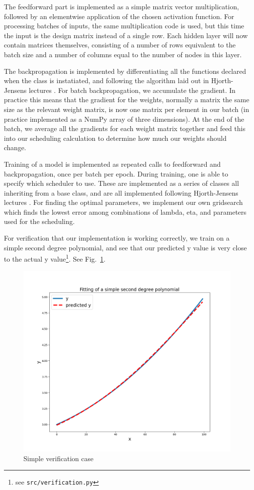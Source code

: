 \documentclass[onecolumn,10pt,cleanfoot]{asme2ej}
\begin{document}
The feedforward part is implemented as a simple matrix vector multiplication, followed by an elementwise application of the chosen activation function. For processing batches of inputs, the same multiplication code is used, but this time the input is the design matrix instead of a single row. Each hidden layer will now contain matrices themselves, consisting of a number of rows equivalent to the batch size and a number of columns equal to the number of nodes in this layer.

The backpropagation is implemented by differentiating all the functions declared when the class is instatiated, and following the algorithm laid out in Hjorth-Jensens lectures \cite{morten}. For batch backpropagation, we accumulate the gradient. In practice this means that the gradient for the weights, normally a matrix the same size as the relevant weight matrix, is now one matrix per element in our batch (in practice implemented as a NumPy array of three dimensions). At the end of the batch, we average all the gradients for each weight matrix together and feed this into our scheduling calculation to determine how much our weights should change.

Training of a model is implemented as repeated calls to feedforward and backpropagation, once per batch per epoch. During training, one is able to specify which scheduler to use. These are implemented as a series of classes all inheriting from a base class, and are all implemented following Hjorth-Jensens lectures \cite{mortensched}. For finding the optimal parameters, we implement our own gridsearch which finds the lowest error among combinations of lambda, eta, and parameters used for the scheduling.

For verification that our implementation is working correctly, we train on a simple second degree polynomial, and see that our predicted y value is very close to the actual y value\footnote{see \texttt{src/verification.py}}. See Fig.~\ref{verification}.

\begin{figure}[h]
\centerline{\includegraphics[width=5in]{figure/verification.png}}
\caption{Simple verification case}
\label{verification}
\end{figure}
\end{document}
